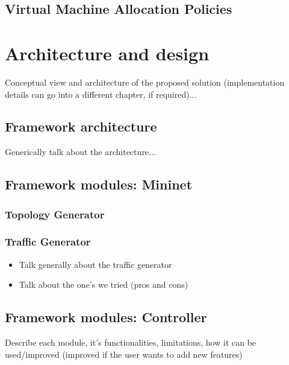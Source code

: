 \documentclass[12pt,english]{book}
\begin{document}
\section{Virtual Machine Allocation Policies}


\chapter{Architecture and design \label{cha:arqdes} }

Conceptual view and architecture of the proposed solution (implementation details can go into a different chapter, if required)...

\section{Framework architecture}

Generically talk about the architecture...


\section{Framework modules: Mininet}

\subsection{Topology Generator}

\subsection{Traffic Generator}

\begin{itemize}
	\item Talk generally about the traffic generator
	\item Talk about the one's we tried (pros and cons)
\end{itemize}

\section{Framework modules: Controller}

Describe each module, it's functionalities, limitations, how it can be used/improved (improved if the user wants to add new features)
\end{document}
